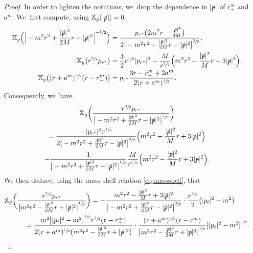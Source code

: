 \documentclass[JEP,XML,SOM,Unicode,published]{cedram}
\theoremstyle{plain}
\theoremstyle{definition}
\newcommand\T{{\mathbb{X}}}
\begin{document}
\begin{proof}
In order to lighten the notations, we~drop the dependence in $|\slashed{p}|$ of $r_\pm^m$ and $a^m$. We~first compute, using $\T_g(|\slashed{p}|)=0$,\vspace*{-5pt}
\begin{align*}
\T_g \Bigl(\Big| -m^2 r^2+\frac{|\slashed{p}|^2}{2M}r-|\slashed{p}|^2 \Big|^{-\sfrac{1}{2}}\Bigr) &=\frac{p_{r^*}\bigl(2m^2 r -\frac{|\slashed{p}|^2}{2M}\bigr)}{2\big|-m^2 r^2+\frac{|\slashed{p}|^2}{2M}r-|\slashed{p}|^2\big|^{\sfrac{3}{2}}}, \\
\T_g \bigl(r^{\sfrac{3}{2}}p_{r^*} \bigr) & = \frac{3}{2}r^{\sfrac{1}{2}}|p_{r^*}|^2-\frac{M}{r^{\sfrac{5}{2}}}\Bigl(m^2 r^2-\frac{|\slashed{p}|^2}{M}r+3|\slashed{p}|^2\Bigr), \\
\T_g \bigl((r+a^{m})^{\sfrac{1}{2}}(r-r_-^m) \bigr) & = p_{r^*}\frac{3r-r_-^m+2a^m}{2(r+a^{m})^{\sfrac{1}{2}}}.
\end{align*}
Consequently, we~have\vspace*{-5pt}
\begin{multline*}
\T_g \biggl(\frac{r^{\sfrac{3}{2}}p_{r^*}}{\big|-m^2 r^2+\frac{|\slashed{p}|^2}{2M}r-|\slashed{p}|^2\big|^{\sfrac{1}{2}}}\biggr) \\
=\frac{-|p_{r^*}|^2r^{\sfrac{1}{2}}}{2\big| -m^2 r^2+\frac{|\slashed{p}|^2}{2M}r-|\slashed{p}|^2 \big|^{\sfrac{3}{2}}}\Bigl(m^2 r^2-\frac{|\slashed{p}|^2}{M}r+3|\slashed{p}|^2\Bigr) \nonumber \\
-\frac{1}{\big| -m^2 r^2+\frac{|\slashed{p}|^2}{2M}r-|\slashed{p}|^2\big|^{\sfrac{1}{2}}}\frac{M}{r^{\sfrac{5}{2}}}\Bigl(m^2 r^2-\frac{|\slashed{p}|^2}{M}r+3|\slashed{p}|^2\Bigr).
\end{multline*}
We then deduce, using the mass-shell relation \eqref{eq:massshell}, that\vspace*{-3pt}
\begin{align*}
&\T_g \biggl(\frac{r^{\sfrac{3}{2}}p_{r^*}}{\big|m^2 r^2-\frac{|\slashed{p}|^2}{2M}r+|\slashed{p}|^2\big|^{\sfrac{1}{2}}}\biggr) =-\frac{m^2 r^2-\frac{|\slashed{p}|^2}{M}r+3|\slashed{p}|^2}{\big| -m^2 r^2+\frac{|\slashed{p}|^2}{2M}r-|\slashed{p}|^2\big|^{\sfrac{3}{2}}}\cdot \frac{r^{\sfrac{1}{2}}}{2} \bigl(|p_t|^2-m^2 \bigr) \\
& \qquad\quad = \frac{m^2 \big| |p_t|^2-m^2 \big|^{\sfrac{1}{2}}r^{\sfrac{1}{2}}(r-r^{m}_+)}{2(r+a^{m})^{\sfrac{1}{2}}\bigl(m^2 r^2-\frac{|\slashed{p}|^2}{2M}r+|\slashed{p}|^2\bigr)} \cdot \frac{(r+a^m)^{\sfrac{1}{2}}(r-r_-^m)}{\big| m^2 r^2-\frac{|\slashed{p}|^2}{2M}r+|\slashed{p}|^2\big|^{\sfrac{1}{2}}}\big| |p_t|^2-m^2 \big|^{\sfrac{1}{2}}.

\end{align*}
\end{proof}
\end{document}
